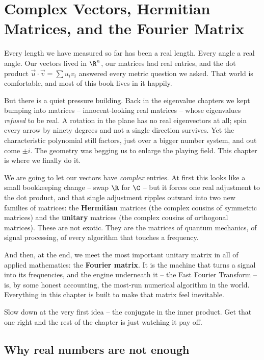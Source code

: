 \chapter{Complex Vectors, Hermitian Matrices, and the Fourier Matrix}

Every length we have measured so far has been a real length. Every angle a real
angle. Our vectors lived in $\R^n$, our matrices had real entries, and the dot
product $\vec u\cdot\vec v=\sum u_iv_i$ answered every metric question we asked.
That world is comfortable, and most of this book lives in it happily.

But there is a quiet pressure building. Back in the eigenvalue chapters we kept
bumping into matrices -- innocent-looking real matrices -- whose eigenvalues
\emph{refused} to be real. A rotation in the plane has no real eigenvectors at
all; spin every arrow by ninety degrees and not a single direction survives.
Yet the characteristic polynomial still factors, just over a bigger number
system, and out come $\pm i$. The geometry was begging us to enlarge the
playing field. This chapter is where we finally do it.

We are going to let our vectors have \emph{complex} entries. At first this looks
like a small bookkeeping change -- swap $\R$ for $\C$ -- but it forces one real
adjustment to the dot product, and that single adjustment ripples outward into
two new families of matrices: the \textbf{Hermitian} matrices (the complex cousins
of symmetric matrices) and the \textbf{unitary} matrices (the complex cousins of
orthogonal matrices). These are not exotic. They are the matrices of quantum
mechanics, of signal processing, of every algorithm that touches a frequency.

And then, at the end, we meet the most important unitary matrix in all of applied
mathematics: the \textbf{Fourier matrix}. It is the machine that turns a signal
into its frequencies, and the engine underneath it -- the Fast Fourier Transform
-- is, by some honest accounting, the most-run numerical algorithm in the world.
Everything in this chapter is built to make that matrix feel inevitable.

Slow down at the very first idea -- the conjugate in the inner product. Get that
one right and the rest of the chapter is just watching it pay off.

\chapterline

\section{Why real numbers are not enough}

